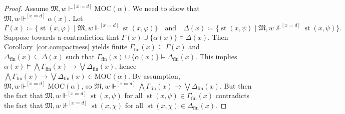 \documentclass[submission,copyright,creativecommons]{eptcs}
\newcommand{\mo}{\mathfrak}
\newcommand{\finset}{_\mathrm{fin}}
\renewcommand{\phi}{\varphi}
\DeclareMathOperator{\st}{st}
\newcommand{\MOC}{\mathrm{MOC}}
\newcommand{\satisfySym}{\Vdash}
\newcommand{\satisfy}[4]{#1, #2 \satisfySym^{#4} #3}
\newcommand{\notsatisfy}[4]{#1, #2 \not\Vdash^{#4} #3}
\begin{document}
\begin{proof}
  Assume $\satisfy{\mo{M}}{w}{\MOC(\alpha)}{[x \coloneq d]}$.
  We need to show that $\satisfy{\mo{M}}{w}{\alpha(x)}{[x \coloneq d]}$.
  Let
  \begin{equation*}
    \Gamma(x) \coloneq \{ \st(x,\phi) \mid \satisfy{\mo{M}}{w}{\st(x,\phi)}{[x \coloneq d]} \}
    \quad\text{and}\quad
    \Delta(x) \coloneq \{ \st(x,\psi) \mid \notsatisfy{\mo{M}}{w}{\st(x,\psi)}{[x \coloneq d]} \}.
  \end{equation*}
  Suppose towards a contradiction that
  $\Gamma(x) \cup \{ \alpha(x) \} \models \Delta(x)$.
  Then Corollary~\ref{cor.compactness} yields finite
  $\Gamma\finset(x) \subseteq \Gamma(x)$
  and $\Delta\finset(x) \subseteq \Delta(x)$ such that
  $\Gamma\finset(x) \cup \{ \alpha(x) \} \models \Delta\finset(x)$.
  This implies $\alpha(x) \models \bigwedge \Gamma\finset(x) \to \bigvee \Delta\finset(x)$,
  hence $\bigwedge \Gamma\finset(x) \to \bigvee \Delta\finset(x) \in \MOC(\alpha)$.
%
  By assumption, $\satisfy{\mo{M}}{w}{\MOC(\alpha)}{[x \coloneq d]}$,
  so $\satisfy{\mo{M}}{w}{\bigwedge \Gamma\finset(x) \to \bigvee \Delta\finset(x)}{[x \coloneq d]}$.
  But then the fact that $\satisfy{\mo{M}}{w}{\st(x,\psi)}{[x\coloneq d]}$ for all
  $\st(x, \psi) \in \Gamma\finset(x)$ contradicts the fact that
  $\notsatisfy{\mo{M}}{w}{\st(x, \chi)}{[x \coloneq d]}$ for all
  $\st(x, \chi) \in \Delta\finset(x)$.


\end{proof}
\end{document}
